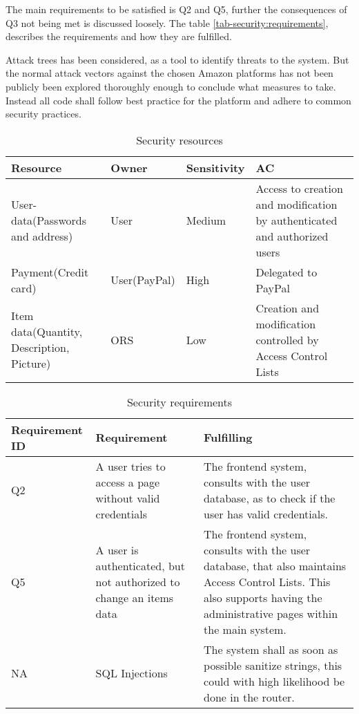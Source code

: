 The main requirements to be satisfied is Q2 and Q5, further the consequences of
Q3 not being met is discussed loosely. The table
\ref{tab-security:requirements}, describes the requirements and how they are
fulfilled.

Attack trees has been considered, as a tool to identify threats to the system.
But the normal attack vectors against the chosen Amazon platforms has not been
publicly been explored thoroughly enough to conclude what measures to take.
Instead all code shall follow best practice for the platform and adhere to
common security practices.

\begin{table}[ht]
    \centering
    \begin{tabular}{p{3cm} | l | l | p{4cm}}
        Resource & Owner & Sensitivity & AC \\ \hline
        User-data(Passwords and address) & User & Medium & Access to creation
            and modification by authenticated and authorized users \\ \hline
        Payment(Credit card) & User(PayPal) & High & Delegated to 
            PayPal \\ \hline
        Item data(Quantity, Description, Picture) & ORS & Low & Creation and
            modification controlled by Access Control Lists \\
    \end{tabular}
    \label{tab:security-resources}
    \caption{Security resources}
\end{table}

\begin{table}[ht]
    \centering
    \begin{tabular}{l | p{5cm} | p{7cm}}
        Requirement ID & Requirement & Fulfilling \\ \hline
        Q2 & A user tries to access a page without valid credentials &
        The frontend system, consults with the user database, as to check if the
        user has valid credentials. \\ \hline
        Q5 & A user is authenticated, but not authorized to change an items
        data & The frontend system, consults with the user database, that also
        maintains Access Control Lists. This also supports having the
        administrative pages within the main system. \\ \hline
        NA & SQL Injections & The system shall as soon as possible sanitize
            strings, this could with high likelihood be done in the router. \\
    \end{tabular}
    \label{tab:security-requirements}
    \caption{Security requirements}
\end{table}


